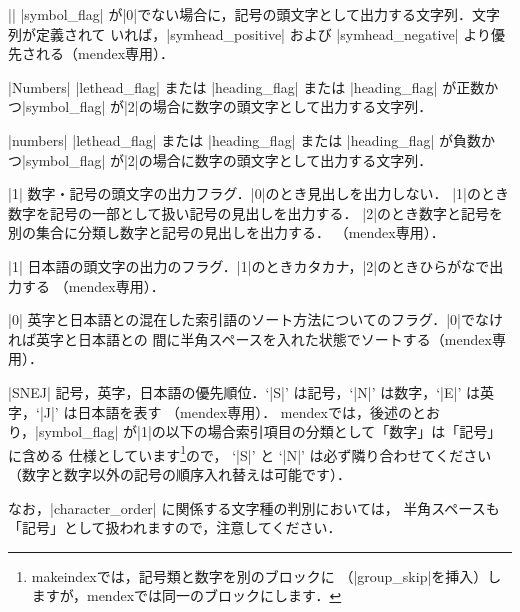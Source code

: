 \documentclass[a4paper,dvipdfmx]{jsarticle}
\newcommand{\SoftName}[1]{\textsf{#1}}
\begin{document}
\begin{description}[leftmargin=3.5cm]
\item[|symbol|] \ParamString*||
|symbol_flag| が|0|でない場合に，記号の頭文字として出力する文字列．文字列が定義されて
いれば，|symhead_positive| および |symhead_negative| より優先される（\SoftName{mendex}専用）．

\item[|numhead\string_positive|] \ParamString*|Numbers|
|lethead_flag| または |heading_flag| または |heading_flag| が正数かつ|symbol_flag| が|2|の場合に数字の頭文字として出力する文字列．

\item[|numhead\string_negative|] \ParamString*|numbers|
|lethead_flag| または |heading_flag| または |heading_flag| が負数かつ|symbol_flag| が|2|の場合に数字の頭文字として出力する文字列．

\item[|symbol\string_flag|] \ParamNum|1|
数字・記号の頭文字の出力フラグ．|0|のとき見出しを出力しない．
|1|のとき数字を記号の一部として扱い記号の見出しを出力する．
|2|のとき数字と記号を別の集合に分類し数字と記号の見出しを出力する．
（\SoftName{mendex}専用）．

\item[|letter\string_head|] \ParamNum|1|
日本語の頭文字の出力のフラグ．|1|のときカタカナ，|2|のときひらがなで出力する
（\SoftName{mendex}専用）．

\item[|priority|] \ParamNum|0|
英字と日本語との混在した索引語のソート方法についてのフラグ．|0|でなければ英字と日本語との
間に半角スペースを入れた状態でソートする（\SoftName{mendex}専用）．

\item[|character\string_order|] \ParamString*|SNEJ|
記号，英字，日本語の優先順位．`|S|' は記号，`|N|' は数字，`|E|' は英字，`|J|' は日本語を表す
（\SoftName{mendex}専用）．
\SoftName{mendex}では，後述のとおり，|symbol_flag| が|1|の以下の場合索引項目の分類として「数字」は「記号」に含める
仕様としています\footnote{\SoftName{makeindex}では，記号類と数字を別のブロックに
（|group\_skip|を挿入）しますが，\SoftName{mendex}では同一のブロックにします．}ので，
`|S|' と `|N|' は必ず隣り合わせてください（数字と数字以外の記号の順序入れ替えは可能です）．

なお，|character_order| に関係する文字種の判別においては，
半角スペースも「記号」として扱われますので，注意してください．
\end{description}
\end{document}
